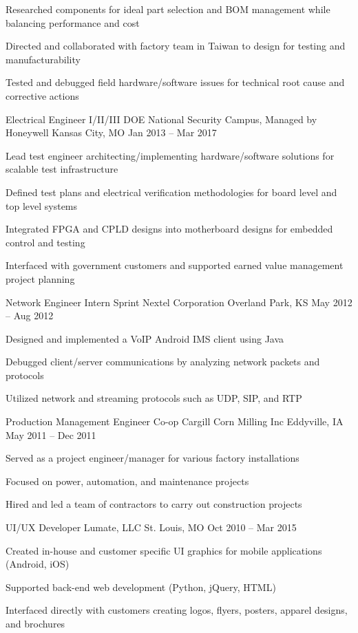 \documentclass[]{awesome-cv}
\begin{document}
\begin{cventries}
{\begin{cvitems}
		\item {Researched components for ideal part selection and BOM management while balancing performance and cost}
		\item {Directed and collaborated with factory team in Taiwan to design for testing and manufacturability}
		\item {Tested and debugged field hardware/software issues for technical root cause and corrective actions}
		\end{cvitems}}
	\cventry
	{Electrical Engineer I/II/III}
	{DOE National Security Campus, Managed by Honeywell}
	{Kansas City, MO}
	{Jan 2013 – Mar 2017}
	{\begin{cvitems}
		\item {Lead test engineer architecting/implementing hardware/software solutions for scalable test infrastructure}
		\item {Defined test plans and electrical verification methodologies for board level and top level systems}
		\item {Integrated FPGA and CPLD designs into motherboard designs for embedded control and testing}
		\item {Interfaced with government customers and supported earned value management project planning}
		\end{cvitems}}
	\cventry
	{Network Engineer Intern}
	{Sprint Nextel Corporation}
	{Overland Park, KS}
	{May 2012 – Aug 2012}
	{\begin{cvitems}
		\item {Designed and implemented a VoIP Android IMS client using Java}
		\item {Debugged client/server communications by analyzing network packets and protocols}
		\item {Utilized network and streaming protocols such as UDP, SIP, and RTP}
		\end{cvitems}}
	\cventry
	{Production Management Engineer Co-op}
	{Cargill Corn Milling Inc}
	{Eddyville, IA}
	{May 2011 – Dec 2011}
	{\begin{cvitems}
		\item {Served as a project engineer/manager for various factory installations}
		\item {Focused on power, automation, and maintenance projects}
		\item {Hired and led a team of contractors to carry out construction projects}
		\end{cvitems}}
	\cventry
	{UI/UX Developer}
	{Lumate, LLC}
	{St. Louis, MO}
	{Oct 2010 – Mar 2015}
	{\begin{cvitems}
		\item {Created in-house and customer specific UI graphics for mobile applications (Android, iOS)}
		\item {Supported back-end web development (Python, jQuery, HTML)}
		\item {Interfaced directly with customers creating logos, flyers, posters, apparel designs, and brochures}
		\end{cvitems}}
\end{cventries}
\end{document}
